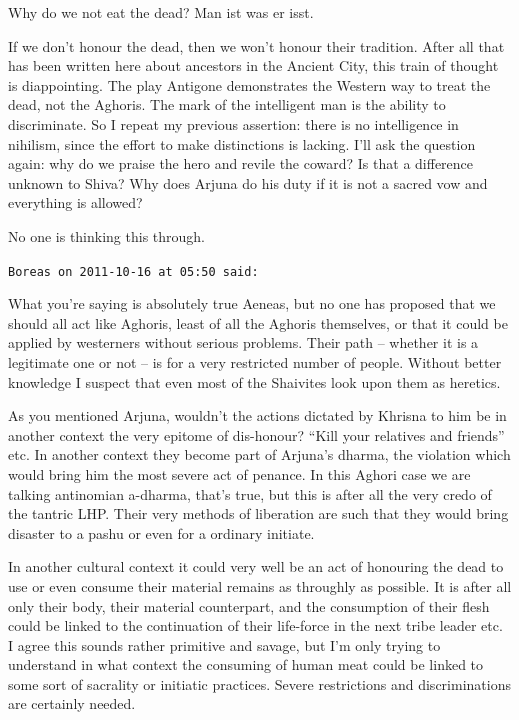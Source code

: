\begin{footnotesize}
\begin{sffamily}
Why do we not eat the dead? Man ist was er isst.

If we don't honour the dead, then we won't honour their tradition. After all that has been written here about ancestors in the Ancient City, this train of thought is diappointing. The play Antigone demonstrates the Western way to treat the dead, not the Aghoris. The mark of the intelligent man is the ability to discriminate. So I repeat my previous assertion: there is no intelligence in nihilism, since the effort to make distinctions is lacking. I'll ask the question again: why do we praise the hero and revile the coward? Is that a difference unknown to Shiva? Why does Arjuna do his duty if it is not a sacred vow and everything is allowed?

No one is thinking this through.

\hfill

\texttt{Boreas on 2011-10-16 at 05:50 said:}

What you're saying is absolutely true Aeneas, but no one has proposed that we should all act like Aghoris, least of all the Aghoris themselves, or that it could be applied by westerners without serious problems. Their path -- whether it is a legitimate one or not -- is for a very restricted number of people. Without better knowledge I suspect that even most of the Shaivites look upon them as heretics.

As you mentioned Arjuna, wouldn't the actions dictated by Khrisna to him be in another context the very epitome of dis-honour? ``Kill your relatives and friends'' etc. In another context they become part of Arjuna's dharma, the violation which would bring him the most severe act of penance. In this Aghori case we are talking antinomian a-dharma, that's true, but this is after all the very credo of the tantric LHP. Their very methods of liberation are such that they would bring disaster to a pashu or even for a ordinary initiate.

In another cultural context it could very well be an act of honouring the dead to use or even consume their material remains as throughly as possible. It is after all only their body, their material counterpart, and the consumption of their flesh could be linked to the continuation of their life-force in the next tribe leader etc. I agree this sounds rather primitive and savage, but I'm only trying to understand in what context the consuming of human meat could be linked to some sort of sacrality or initiatic practices. Severe restrictions and discriminations are certainly needed.


\end{sffamily}
\end{footnotesize}
